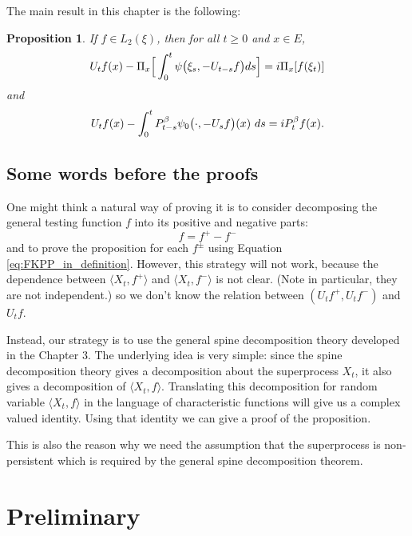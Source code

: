 \documentclass[UTF8]{pkuthss}
\theoremstyle{plain}
\newtheorem{prop}[thm]{Proposition}
\theoremstyle{definition}
\numberwithin{equation}{section}
\begin{document}
    The main result in this chapter is the following:
\begin{prop}
\label{prop: complex FKPP-equation}
    If $f\in L_2(\xi)$,  then for all $t\geq 0$ and $x\in E$,
\begin{equation}
\label{eq: complex FKPP-equation}
    U_tf(x) - \Pi_x \Big[\int_0^t \psi\big(\xi_s, - U_{t-s}f\big) ds \Big]
    \\= i \Pi_x [f(\xi_t)]
\end{equation}
    and
\begin{equation}
\label{eq: complex FKPP-equation with FK-transform}
    U_tf(x) -  \int_0^t P_{t-s}^{\beta} \psi_0\big(\cdot,-U_sf\big) (x)~ds
    \\= iP_t^{\beta} f(x).
\end{equation}
\end{prop}

\subsection{Some words before the proofs}
	One might think a natural way of proving it is to consider decomposing the general testing function $f$ into its positive and negative parts:
\[
	f= f^+ -f^-
\]
	and to prove the proposition for each $f^\pm$ using Equation \eqref{eq:FKPP_in_definition}.
	However, this strategy will not work, because the dependence between $\langle X_t,f^+\rangle$ and $\langle X_t,f^-\rangle $ is not clear. (Note in particular, they are not independent.) so we don't know the relation between $(U_tf^+,U_tf^-)$ and $U_tf$.

	Instead, our strategy is to use the general spine decomposition theory developed in the Chapter 3. 
	The underlying idea is very simple: since the spine decomposition theory gives a decomposition about the superprocess $X_t$, it also gives a decomposition of $\langle X_t,f\rangle$. 
	Translating this decomposition for random variable $\langle X_t,f\rangle$ in the language of characteristic functions will give us a complex valued identity. 
	Using that identity we can give a proof of the proposition.

	This is also the reason why we need the assumption that the superprocess is non-persistent which is required by the general spine decomposition theorem. 

\section{Preliminary}
\end{document}
